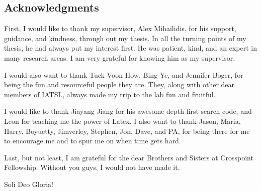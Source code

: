 \documentclass{ut-thesis}
\begin{document}
\begin{preliminary}

\section*{Acknowledgments}
First, I would like to thank my supervisor, Alex Mihailidis, for his support, guidance, and kindness, through out my thesis.  In all the turning points of my thesis, he had always put my interest first.  He was patient, kind, and an expert in many research areas.  I am very grateful for knowing him as my supervisor.

I would also want to thank Tuck-Voon How, Bing Ye, and Jennifer Boger, for being the fun and resourceful people they are.  They, along with other dear members of IATSL, always made my trip to the lab fun and fruitful.

I would like to thank Jiayang Jiang for his awesome depth first search code, and Leon for teaching me the power of Latex.  I also want to thank Jason, Maria, Harry, Boyuetty, Jimverley, Stephen, Jon, Dave, and PA, for being there for me to encourage me and to spur me on when time gets hard.

Last, but not least, I am grateful for the dear Brothers and Sisters at Crosspoint Fellowship.  Without you guys, I would not have made it.

Soli Deo Gloria!


\listoffigures
\listoftables


\tableofcontents




\end{preliminary}
\end{document}
